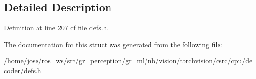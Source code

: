 \subsection{Detailed Description}


Definition at line 207 of file defs.\+h.



The documentation for this struct was generated from the following file\+:\begin{DoxyCompactItemize}
\item 
/home/jose/ros\+\_\+ws/src/gr\+\_\+perception/gr\+\_\+ml/nb/vision/torchvision/csrc/cpu/decoder/defs.\+h\end{DoxyCompactItemize}
